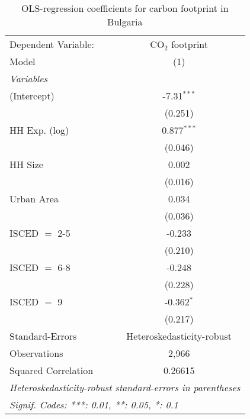 
\begin{table}[htbp!]
   \centering
   \small
   \begin{adjustbox}{width = 1\textwidth, max height = 0.95\textheight, center}
      \begin{threeparttable}[b]
         \caption{\label{tab:OLS_2_BGR} OLS-regression coefficients for carbon footprint in Bulgaria}
         \begin{tabular}{lc}
            \tabularnewline \midrule \midrule
            Dependent Variable: & CO$_{2}$ footprint\\  
            Model               & (1)\\  
            \midrule
            \emph{Variables}\\
            (Intercept)         & -7.31$^{***}$\\   
                                & (0.251)\\   
            HH Exp. (log)       & 0.877$^{***}$\\   
                                & (0.046)\\   
            HH Size             & 0.002\\   
                                & (0.016)\\   
            Urban Area          & 0.034\\   
                                & (0.036)\\   
            ISCED $=$ 2-5       & -0.233\\   
                                & (0.210)\\   
            ISCED $=$ 6-8       & -0.248\\   
                                & (0.228)\\   
            ISCED $=$ 9         & -0.362$^{*}$\\   
                                & (0.217)\\   
            \midrule 
            Standard-Errors     & Heteroskedasticity-robust \\   
            Observations        & 2,966\\  
            Squared Correlation & 0.26615\\  
            \midrule \midrule
            \multicolumn{2}{l}{\emph{Heteroskedasticity-robust standard-errors in parentheses}}\\
            \multicolumn{2}{l}{\emph{Signif. Codes: ***: 0.01, **: 0.05, *: 0.1}}\\
         \end{tabular}
         

\end{threeparttable}
\end{adjustbox}
\end{table}
